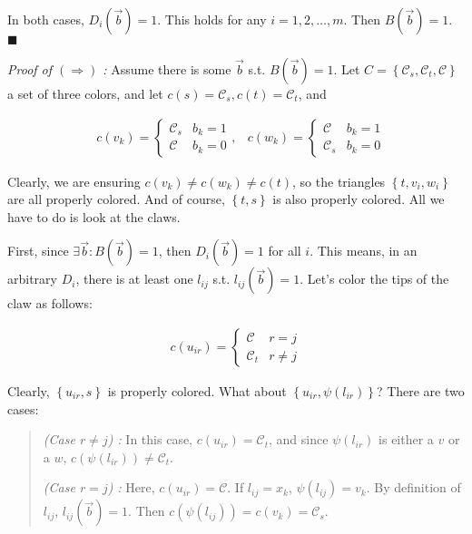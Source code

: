 In both cases, $D_i(\overrightarrow{b}) = 1$. This holds for any $i = 1, 2,
\ldots, m$. Then $B(\overrightarrow{b}) = 1$. $\blacksquare$

\textit{Proof of $(\Rightarrow)$ :} Assume there is some $\overrightarrow{b}$
s.t. $B(\overrightarrow{b}) = 1$. Let $C = \left\{ \mathcal{C}_s,
\mathcal{C}_t, \mathcal{C} \right\} $ a set of three colors, and let $c(s) =
\mathcal{C}_s, c(t) = \mathcal{C}_t$, and 

\begin{align*}
    &c(v_k) = \begin{cases}
        \mathcal{C}_s & b_k = 1 \\ 
        \mathcal{C} & b_k = 0
    \end{cases}, &c(w_k) = \begin{cases}
    \mathcal{C} & b_k = 1 \\ 
    \mathcal{C}_s & b_k = 0
    \end{cases}
\end{align*}

Clearly, we are ensuring $c(v_k) \neq c(w_k) \neq c(t)$, so the triangles
$\left\{ t, v_i, w_i \right\} $ are all properly colored. And of course,
$\left\{ t, s \right\} $ is also properly colored. All we have to do is look at
the claws.

First, since $\exists \overrightarrow{b} : B(\overrightarrow{b}) = 1$, then
$D_i(\overrightarrow{b}) = 1$ for all $i$. This means, in an arbitrary $D_i$,
there is at least one $l_{ij}$ s.t. $l_{ij}(\overrightarrow{b}) = 1$. Let's 
color the tips of the claw as follows:

\begin{align*}
    c(u_{ir}) = \begin{cases}
        \mathcal{C} & r = j \\ 
        \mathcal{C}_t & r \neq j
    \end{cases}
\end{align*}

Clearly, $\left\{ u_{ir}, s \right\} $ is properly colored. What about $\left\{ u_{ir}, \psi(l_{ir}) \right\} $? There are two cases: 

\begin{quote}
    \textit{(Case $r \neq j$) :} In this case, $c(u_{ir}) = \mathcal{C}_t$, and since $\psi(l_{ir})$ is either a $v$ or a $w$, $c(\psi(l_{ir})) \neq \mathcal{C}_t$. 

    \textit{(Case $r = j$) :} Here, $c(u_{ir}) = \mathcal{C}$. If $l_{ij} = x_k$, $\psi(l_{ij}) = v_k$. By definition of $l_{ij}$, $l_{ij}(\overrightarrow{b}) = 1$. Then $c(\psi(l_{ij})) = c(v_k) = \mathcal{C}_s$. 
\end{quote}

